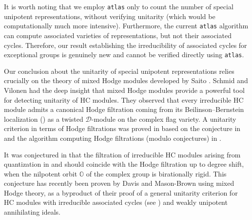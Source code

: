 \documentclass[11pt, a4paper]{amsart}
\newcommand{\orb}{\mathbb{O}}
\newcommand{\sD}{\mathscr{D}}
\theoremstyle{definition}
\numberwithin{equation}{section}
\begin{document}
It is worth noting that we employ \texttt{atlas} only to count the number of special unipotent representations, without verifying unitarity (which would be computationally much more intensive). Furthermore, the current \texttt{atlas} algorithm can compute associated varieties of representations, but not their associated cycles. Therefore, our result establishing the irreducibility of associated cycles for exceptional groups is genuinely new and cannot be verified directly using \texttt{atlas}.

Our conclusion about the unitarity of special unipotent representations relies crucially on the theory of mixed Hodge modules developed by Saito \cite{Saito88, Saito90}. Schmid and Vilonen \cite{SchmidVilonen} had the deep insight that mixed Hodge modules provide a powerful tool for detecting unitarity of HC modules. They observed that every irreducible HC module admits a canonical Hodge filtration coming from its Beilinson--Bernstein localization (\cite{BeilinsonBernstein}) as a twisted $\sD$-module on the complex flag variety. A unitarity criterion in terms of Hodge filtrations was proved in \cite{DavisVilonen:unitary} based on the conjecture in \cite{SchmidVilonen} and the algorithm computing Hodge filtrations (modulo conjectures) in \cite{AdamsTrapaVogan}.

It was conjectured in \cite[Remark 7.3.4]{LY} that the filtration of irreducible HC modules arising from quantization in \cite{LY} and \cite{LosevYu} should coincide with the Hodge filtration up to degree shift, when the nilpotent orbit $\orb$ of the complex group is birationally rigid. This conjecture has recently been proven by Davis and Mason-Brown \cite{DMB-Hodge} using mixed Hodge theory, as a byproduct of their proof of a general unitarity criterion \cite[Theorem 5.22]{DMB-Hodge} for HC modules with irreducible associated cycles (see ) and weakly unipotent annihilating ideals. 
\end{document}
